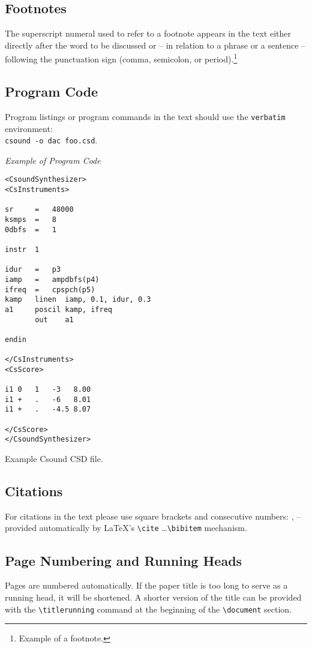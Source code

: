 \documentclass[runningheads,a4paper]{llncs}
\begin{document}
\subsection{Footnotes}

The superscript numeral used to refer to a footnote appears in the text
either directly after the word to be discussed or -- in relation to a
phrase or a sentence -- following the punctuation sign (comma, semicolon,
or period).\footnote{Example of a footnote.}

\subsection{Program Code}

Program listings or program commands in the text should use the \verb+verbatim+
environment: \\ \verb+csound -o dac foo.csd+.

\medskip

\noindent
{\it Example of Program Code}
	\begin{verbatim}
<CsoundSynthesizer>
<CsInstruments>

sr     =   48000
ksmps  =   8
0dbfs  =   1

instr  1

idur   =   p3
iamp   =   ampdbfs(p4)
ifreq  =   cpspch(p5)
kamp   linen  iamp, 0.1, idur, 0.3
a1     poscil kamp, ifreq
       out    a1

endin

</CsInstruments>
<CsScore>

i1 0   1   -3   8.00
i1 +   .   -6   8.01
i1 +   .   -4.5 8.07

</CsScore>
</CsoundSynthesizer>
	\end{verbatim}
%
\noindent
{\small Example Csound CSD file.}

\subsection{Citations}

For citations in the text please use square brackets and consecutive
numbers: \cite{jour}, \cite{proceeding} -- provided automatically
by \LaTeX 's \verb|\cite| \dots\verb|\bibitem| mechanism.

\subsection{Page Numbering and Running Heads}

Pages are numbered automatically. If the paper title is too long to serve
as a running head, it will be shortened. A shorter version of the title can
be provided with the \verb+\titlerunning+ command at the beginning of the
\verb+\document+ section.
\end{document}
